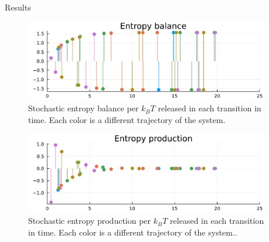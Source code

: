 \documentclass[final]{beamer}
\newlength{\sepwidth}
\newlength{\colwidth}
\newcommand{\separatorcolumn}{\begin{column}{\sepwidth}\end{column}}
\begin{document}
\begin{frame}[t]
\begin{columns}[t]
\begin{column}{\colwidth}
\begin{block}{Results}
\begin{figure}
\begin{center}
%
\includegraphics[scale=1.2]{graphics/f4.pdf}
\end{center}
\label{fig 2-state-system}
\caption{Stochastic entropy balance per $k_B T$ released in each transition in time. Each color is a different trajectory of the system.}
\end{figure}

\begin{figure}
\begin{center}
%
\includegraphics[scale=1.2]{graphics/f5.pdf}
\end{center}
\label{fig 2-state-system}
\caption{Stochastic entropy production per $k_B T$ released in each transition in time. Each color is a different trajectory of the system..}
\end{figure}

%
%
%
%
%
%
%
\end{block}


\end{column}

\separatorcolumn
\end{columns}
 \end{frame}
\end{document}
